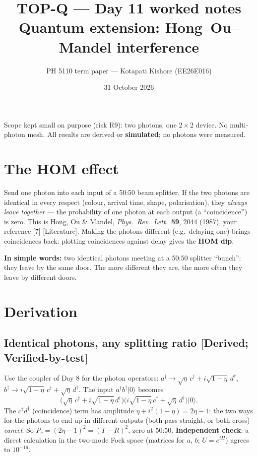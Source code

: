 \documentclass[10pt,a4paper]{article}
\title{TOP-Q --- Day 11 worked notes\\[2pt]\large Quantum extension: Hong--Ou--Mandel interference}
\author{PH 5110 term paper --- Kotapati Kishore (EE26E016)}
\date{31 October 2026}
\newcommand{\note}[1]{\par\smallskip\noindent\colorbox{gray!12}{\parbox{\dimexpr\linewidth-2\fboxsep}{\small #1}}\par\smallskip}
\newcommand{\evd}[1]{\textsf{\small[#1]}}
\newcommand{\simple}[1]{\par\noindent\textbf{In simple words:} #1\par\smallskip}
\begin{document}
\sloppy\maketitle

\note{Scope kept small on purpose (risk R9): two photons, one $2\times2$ device. No multi-photon mesh. All results are derived or \textbf{simulated}; no photons were measured.}

\tableofcontents

\section{The HOM effect}
Send one photon into each input of a 50:50 beam splitter. If the two photons are identical in every respect (colour, arrival time, shape, polarisation), they \emph{always leave together} --- the probability of one photon at each output (a ``coincidence'') is zero. This is Hong, Ou \& Mandel, \emph{Phys.\ Rev.\ Lett.}\ \textbf{59}, 2044 (1987), your reference [7] \evd{Literature}. Making the photons different (e.g.\ delaying one) brings coincidences back: plotting coincidences against delay gives the \textbf{HOM dip}.

\simple{two identical photons meeting at a 50:50 splitter ``bunch'': they leave by the same door. The more different they are, the more often they leave by different doors.}

\section{Derivation}
\subsection{Identical photons, any splitting ratio \evd{Derived; Verified-by-test}}
Use the coupler of Day 8 for the photon operators: $a^\dagger\to\sqrt\eta\,c^\dagger+i\sqrt{1-\eta}\,d^\dagger$, $b^\dagger\to i\sqrt{1-\eta}\,c^\dagger+\sqrt\eta\,d^\dagger$. The input $a^\dagger b^\dagger|0\rangle$ becomes
\[
\big(\sqrt\eta\,c^\dagger+i\sqrt{1-\eta}\,d^\dagger\big)\big(i\sqrt{1-\eta}\,c^\dagger+\sqrt\eta\,d^\dagger\big)|0\rangle .
\]
The $c^\dagger d^\dagger$ (coincidence) term has amplitude $\eta+i^2(1-\eta)=2\eta-1$: the two ways for the photons to end up in different outputs (both pass straight, or both cross) \emph{cancel}. So $P_c=(2\eta-1)^2=(T-R)^2$, zero at 50:50. \textbf{Independent check}: a direct calculation in the two-mode Fock space (matrices for $a$, $b$; $U=e^{iH}$) agrees to $10^{-16}$.
\end{document}
